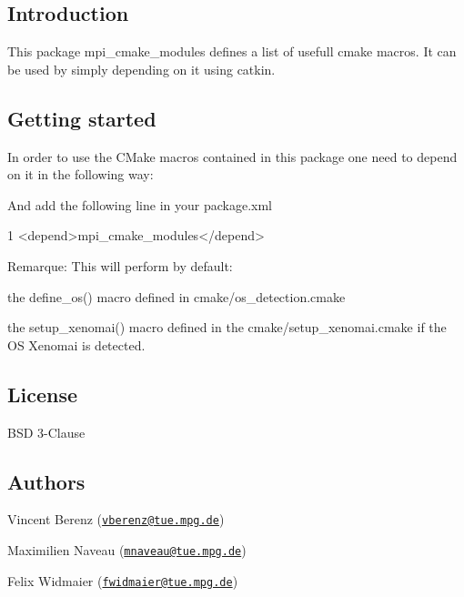 \subsection*{Introduction}

This package {\ttfamily mpi\+\_\+cmake\+\_\+modules} defines a list of usefull cmake macros. It can be used by simply depending on it using catkin.

\subsection*{Getting started}

In order to use the C\+Make macros contained in this package one need to depend on it in the following way\+: 


And add the following line in your {\ttfamily package.\+xml}


\begin{DoxyCode}
1 <\textcolor{keywordtype}{depend}>\textcolor{keyword}{mpi\_cmake\_modules}</\textcolor{keywordtype}{depend}>
\end{DoxyCode}


Remarque\+: This will perform by default\+:
\begin{DoxyItemize}
\item the {\ttfamily define\+\_\+os()} macro defined in cmake/os\+\_\+detection.\+cmake
\item the {\ttfamily setup\+\_\+xenomai()} macro defined in the cmake/setup\+\_\+xenomai.\+cmake if the OS Xenomai is detected.
\end{DoxyItemize}

\subsection*{License}

B\+SD 3-\/\+Clause

\subsection*{Authors}


\begin{DoxyItemize}
\item Vincent Berenz (\href{mailto:vberenz@tue.mpg.de}{\tt vberenz@tue.\+mpg.\+de})
\item Maximilien Naveau (\href{mailto:mnaveau@tue.mpg.de}{\tt mnaveau@tue.\+mpg.\+de})
\item Felix Widmaier (\href{mailto:fwidmaier@tue.mpg.de}{\tt fwidmaier@tue.\+mpg.\+de}) 
\end{DoxyItemize}